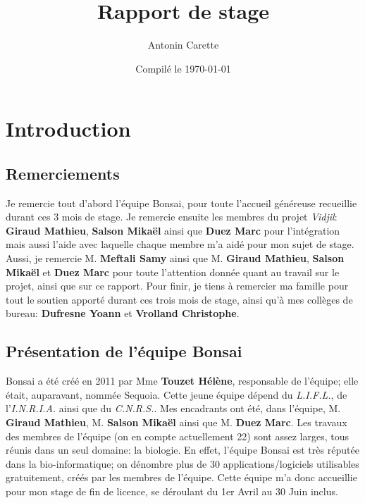 \documentclass{report}
\title{Rapport de stage}
\author{Antonin Carette}
\date{Compilé le \today}
\begin{document}
\maketitle

\tableofcontents


\chapter{Introduction}

\section{Remerciements}
Je remercie tout d'abord l'équipe Bonsai, pour toute l'accueil généreuse recueillie durant ces 3 mois de stage.
\newline 
Je remercie ensuite les membres du projet \textit{Vidjil}: \textbf{Giraud Mathieu}, \textbf{Salson Mikaël} ainsi que \textbf{Duez Marc} pour l'intégration mais aussi l'aide avec laquelle chaque membre m'a aidé pour mon sujet de stage.
\newline
Aussi, je remercie M. \textbf{Meftali Samy} ainsi que M. \textbf{Giraud Mathieu}, \textbf{Salson Mikaël} et \textbf{Duez Marc} pour toute l'attention donnée quant au travail sur le projet, ainsi que sur ce rapport.
\newline
Pour finir, je tiens à remercier ma famille pour tout le soutien apporté durant ces trois mois de stage, ainsi qu'à mes collèges de bureau: \textbf{Dufresne Yoann} et \textbf{Vrolland Christophe}.

\section{Présentation de l'équipe Bonsai}
Bonsai a été créé en 2011 par Mme \textbf{Touzet Hélène}, responsable de l'équipe; elle était, auparavant, nommée Sequoia.
\newline
Cette jeune équipe dépend du \textit{L.I.F.L.}, de l'\textit{I.N.R.I.A.} ainsi que du \textit{C.N.R.S.}.
\newline
Mes encadrants ont été, dans l'équipe, M. \textbf{Giraud Mathieu}, M. \textbf{Salson Mikaël} ainsi que M. \textbf{Duez Marc}.
\newline
Les travaux des membres de l'équipe (on en compte actuellement 22) sont assez larges, tous réunis dans un seul domaine: la biologie.
\newline
En effet, l'équipe Bonsai est très réputée dans la bio-informatique; on dénombre plus de 30 applications/logiciels utilisables gratuitement, créés par les membres de l'équipe.
\newline
Cette équipe m'a donc accueillie pour mon stage de fin de licence, se déroulant du 1er Avril au 30 Juin inclus.
\end{document}
